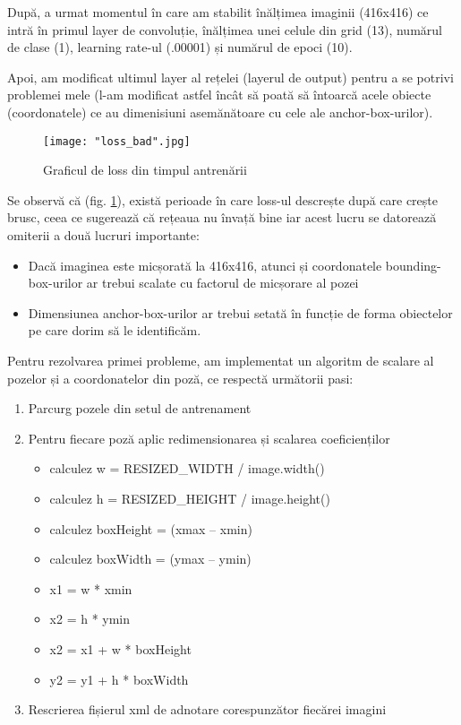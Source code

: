 \documentclass[a4paper, 12pt]{article}
\begin{document}
	\quad\space\space După, a urmat momentul în care am stabilit înălțimea imaginii (416x416) ce intră în primul layer de convoluție, înălțimea unei celule din grid (13), numărul de clase (1), learning rate-ul (.00001) și numărul de epoci (10). 
	
	Apoi, am modificat ultimul layer al rețelei (layerul de output) pentru a se potrivi problemei mele (l-am modificat astfel încât să poată să întoarcă acele obiecte (coordonatele) ce au dimenisiuni asemănătoare cu cele ale anchor-box-urilor).
	
	\begin{figure}[H]
		\centering
		\texttt{[image: "loss\_bad".jpg]}
		\caption{Graficul de loss din timpul antrenării}\label{fig::loss_bad}
	\end{figure} 
	
	Se observă că (fig. \ref{fig::loss_bad}), există perioade în care loss-ul descrește după care crește brusc, ceea ce sugerează că rețeaua nu învață bine iar acest lucru se datorează omiterii a două lucruri importante: 
	\begin{itemize}
		\item Dacă imaginea este micșorată la 416x416, atunci și coordonatele bounding-box-urilor ar trebui scalate cu factorul de micșorare al pozei
		\item Dimensiunea anchor-box-urilor ar trebui setată în funcție de forma obiectelor pe care dorim să le identificăm.
	\end{itemize}
	
	Pentru rezolvarea primei probleme, am implementat un algoritm de scalare al pozelor și a coordonatelor din poză, ce respectă următorii pasi:
	
	\begin{enumerate}
		\item Parcurg pozele din setul de antrenament
		\item Pentru fiecare poză aplic redimensionarea și scalarea coeficienților
		\begin{itemize}
			\item calculez w = RESIZED\_WIDTH / image.width()
			\item calculez h =  RESIZED\_HEIGHT / image.height()
			\item calculez boxHeight = (xmax – xmin)
			\item calculez boxWidth = (ymax – ymin)
			\item x1 = w * xmin
			\item x2 = h * ymin
			\item x2 = x1 + w * boxHeight
			\item y2 = y1 + h * boxWidth
		\end{itemize}
		\item Rescrierea fișierul xml de adnotare corespunzător fiecărei imagini
	\end{enumerate}
	
\end{document}
